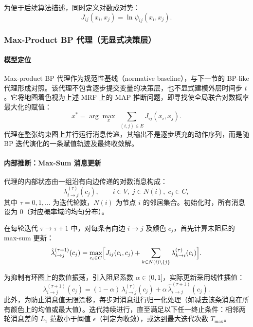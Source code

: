 为便于后续算法描述，同时定义对数成对势：
\begin{equation}
  J_{ij}(x_i, x_j) = \ln \psi_{ij}(x_i, x_j).
\end{equation}


\subsubsection{Max-Product BP 代理（无显式决策层）}
\paragraph{模型定位}
Max-product BP 代理作为规范性基线（normative baseline），与下一节的 BP-like 代理形成对照。该代理不包含逐步提交变量的决策层，也不显式建模外层时间步 $t$。它将地图着色视为上述 MRF 上的 MAP 推断问题，即寻找使全局联合对数概率最大化的赋值：
\begin{equation}
  x^{*} = \arg\max_{x}\; \sum_{(i,j)\in E} J_{ij}(x_i, x_j).
\end{equation}
代理在整张约束图上并行运行消息传递，其输出不是逐步填充的动作序列，而是随 BP 迭代演化的一条赋值轨迹及最终收敛解。

\paragraph{内部推断：Max-Sum 消息更新}
代理的内部状态由一组沿有向边传递的对数消息构成：
\begin{equation}
  \lambda_{i\to j}^{(\tau)}(c_j),\qquad
  i\in V,\; j\in N(i),\; c_j\in C,
\end{equation}
其中 $\tau=0,1,\ldots$ 为迭代轮数，$N(i)$ 为节点 $i$ 的邻居集合。初始化时，所有消息设为 $0$（对应概率域的均匀分布）。

在每轮迭代 $\tau\to \tau+1$ 中，对每条有向边 $i\to j$ 及颜色 $c_j$，首先计算未阻尼的 max-sum 更新：
\begin{equation}
  \hat{\lambda}_{i\to j}^{(\tau+1)}(c_j)
  =
  \max_{c_i\in C}
  \Bigl[
    J_{ij}(c_i, c_j)
    +
    \sum_{k\in N(i)\setminus\{j\}}
    \lambda_{k\to i}^{(\tau)}(c_i)
  \Bigr].
\end{equation}


为抑制有环图上的数值振荡，引入阻尼系数 $\alpha\in(0,1]$，实际更新采用线性插值：
\begin{equation}
  \lambda_{i\to j}^{(\tau+1)}(c_j)
  =
  (1-\alpha)\,\lambda_{i\to j}^{(\tau)}(c_j)
  +
  \alpha\,\hat{\lambda}_{i\to j}^{(\tau+1)}(c_j).
\end{equation}
此外，为防止消息值无限漂移，每步对消息进行归一化处理（如减去该条消息在所有颜色上的均值或最大值）。迭代持续进行，直至满足以下任一终止条件：相邻两轮消息差的 $L_1$ 范数小于阈值 $\epsilon$（判定为收敛），或达到最大迭代次数 $T_{\max}$。

